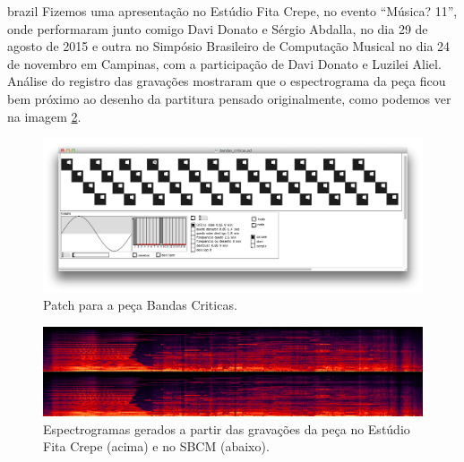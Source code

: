 \begin{otherlanguage*}{brazil}
Fizemos uma apresentação no Estúdio Fita Crepe, no evento ``Música? 11'', onde performaram junto comigo Davi Donato e Sérgio Abdalla, no dia 29 de agosto de 2015 e outra no Simpósio Brasileiro de Computação Musical no dia 24 de novembro em Campinas, com a participação de Davi Donato e Luzilei Aliel. Análise do registro das gravações mostraram que o espectrograma da peça ficou bem próximo ao desenho da partitura pensado originalmente, como podemos ver na imagem \ref{bandasciticasspec}. 

\begin{figure}[htb]
    \caption{\label{bandaspatch}Patch para a peça Bandas Criticas. }
    \begin{center}
    \includegraphics[width=1\linewidth]{pictures/cap3/bandascriticaspd}
    \end{center}
\end{figure}

\begin{figure}[htb]
    \caption{\label{bandasciticasspec}Espectrogramas gerados a partir das gravações da peça no Estúdio Fita Crepe (acima) e no SBCM (abaixo). }
    \begin{center}
    \includegraphics[width=1\linewidth]{pictures/cap3/bandascriticasspectro2}
    \end{center}
\end{figure}




\end{otherlanguage*}
